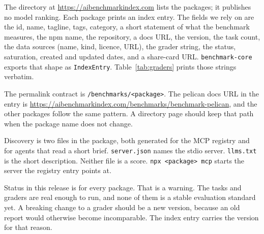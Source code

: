 The directory at \url{https://aibenchmarkindex.com} lists the packages; it publishes no model ranking. Each package prints an index entry. The fields we rely on are the id, name, tagline, tags, category, a short statement of what the benchmark measures, the npm name, the repository, a docs URL, the version, the task count, the data sources (name, kind, licence, URL), the grader string, the status, saturation, created and updated dates, and a share-card URL. \texttt{benchmark-core} exports that shape as \texttt{IndexEntry}. Table~\ref{tab:graders} prints those strings verbatim.

The permalink contract is \texttt{/benchmarks/<package>}. The pelican docs URL in the entry is \url{https://aibenchmarkindex.com/benchmarks/benchmark-pelican}, and the other packages follow the same pattern. A directory page should keep that path when the package name does not change.

Discovery is two files in the package, both generated for the MCP registry and for agents that read a short brief. \texttt{server.json} names the stdio server. \texttt{llms.txt} is the short description. Neither file is a score. \texttt{npx <package> mcp} starts the server the registry entry points at.

Status in this release is \texttt{\suiteStatus{}} for every package. That is a warning. The tasks and graders are real enough to run, and none of them is a stable evaluation standard yet. A breaking change to a grader should be a new version, because an old report would otherwise become incomparable. The index entry carries the version for that reason.
